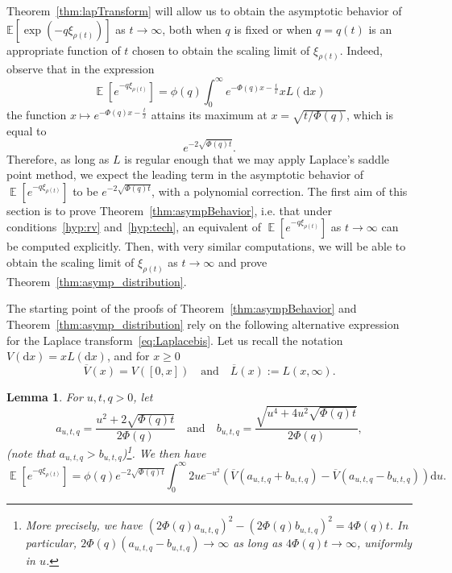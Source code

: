 \documentclass[10pt]{amsart}
\newtheorem{lemm}[theo]{Lemma}
\theoremstyle{definition}
\numberwithin{equation}{section}
\newcommand{\bbE}{\mathbb{E}}
\DeclareMathOperator{\E}{\mathbb{E}}
\newcommand{\dd}{\mathrm{d}}
\renewcommand{\bar}[1]{\overline{#1}}
\begin{document}
Theorem~\ref{thm:lapTransform} will allow us to obtain the asymptotic behavior of $\bbE[\exp(-q\xi_{\rho(t)})]$ as $t\rightarrow \infty$, both when $q$ is fixed or when $q=q(t)$ is an appropriate function of $t$ chosen to obtain the scaling limit of $\xi_{\rho(t)}$. Indeed, observe that in the expression
\begin{equation}\label{eq:Laplacebis}
\E\left[e^{-q \xi_{\rho(t)}}\right] = \phi(q)\int_0^\infty e^{-\Phi(q)x-\frac{t}{x}} xL(\dd x)
\end{equation}
the function $x \mapsto e^{-\Phi(q)x-\frac{t}{x}}$ attains its maximum at $x=\sqrt{t/\Phi(q)}$, which is equal to
\[
e^{-2 \sqrt{\Phi(q)t}}.
\]
Therefore, as long as $L$ is regular enough that we may apply Laplace's saddle point method, we expect the leading term in the asymptotic behavior of $\E[e^{-q \xi_{\rho(t)}}]$ to be $e^{-2 \sqrt{\Phi(q)t}}$, with a polynomial correction. The first aim of this section is to prove Theorem~\ref{thm:asympBehavior}, i.e. that under conditions~\eqref{hyp:rv} and~\eqref{hyp:tech}, an equivalent of $\E[e^{-q \xi_{\rho(t)}}]$ as $t \to \infty$ can be computed explicitly. Then, with very similar computations, we will be able to obtain the scaling limit of $\xi_{\rho(t)}$ as $t \to \infty$ and prove Theorem~\ref{thm:asymp_distribution}.

The starting point of the proofs of Theorem~\ref{thm:asympBehavior} and Theorem~\ref{thm:asymp_distribution} rely on the following alternative expression for the Laplace transform~\eqref{eq:Laplacebis}. Let us recall the notation $V(\dd x) = x L(\dd x)$, and for $x \geq 0$
\[
\bar{V}(x) = V([0,x]) \quad \text{and} \quad \bar{L}(x) :=L(x,{\infty}).
\]


\begin{lemm}\label{eq:dev}
For $u, t, q >0$, let
\[
a_{u,t,q} = \frac{u^2+2 \sqrt{\Phi(q)t}}{2\Phi(q)} \quad \text{and} \quad b_{u,t,q} = \frac{\sqrt{u^4+4u^2 \sqrt{\Phi(q)t}}}{2\Phi(q)},
\]
\emph{(}note that $a_{u,t,q}>b_{u,t,q}$\emph{)}\footnote{More precisely, we have $(2\Phi(q) a_{u,t,q})^2 - (2 \Phi(q)b_{u,t,q})^2 = 4 \Phi(q) t$. In particular, $2 \Phi(q)(a_{u,t,q} - b_{u,t,q}) \to \infty$ as long as $4 \Phi(q)t \to \infty$, uniformly in $u$.}. We then have
\begin{equation*}
\E\left[e^{-q\xi_{\rho(t)}}\right] = \phi(q) e^{-2 \sqrt{\Phi(q)t}}\int_0^\infty 2u e^{-u^2} \left(\bar V \left(a_{u,t,q}+b_{u,t,q}\right) - \bar V \left(a_{u,t,q}-b_{u,t,q}\right) \right) \dd u.
\end{equation*}
\end{lemm}
\end{document}
